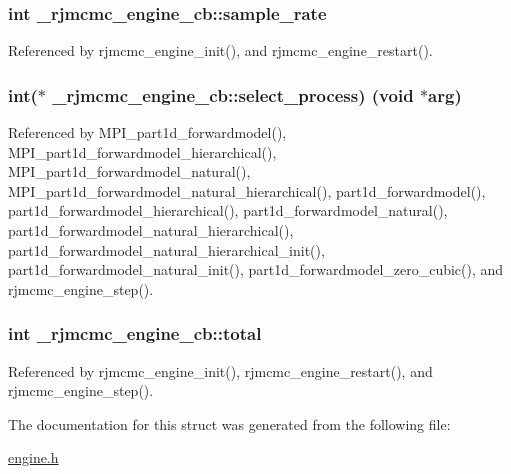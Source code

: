 \subsubsection[{\texorpdfstring{sample\+\_\+rate}{sample_rate}}]{\setlength{\rightskip}{0pt plus 5cm}int \+\_\+rjmcmc\+\_\+engine\+\_\+cb\+::sample\+\_\+rate}\hypertarget{struct__rjmcmc__engine__cb_a777c71c86acd53370442841472c24ef1}{}\label{struct__rjmcmc__engine__cb_a777c71c86acd53370442841472c24ef1}


Referenced by rjmcmc\+\_\+engine\+\_\+init(), and rjmcmc\+\_\+engine\+\_\+restart().

\subsubsection[{\texorpdfstring{select\+\_\+process}{select_process}}]{\setlength{\rightskip}{0pt plus 5cm}int($\ast$ \+\_\+rjmcmc\+\_\+engine\+\_\+cb\+::select\+\_\+process) (void $\ast${\bf arg})}\hypertarget{struct__rjmcmc__engine__cb_a7017792797b8ce47ed670044f1bc8a0d}{}\label{struct__rjmcmc__engine__cb_a7017792797b8ce47ed670044f1bc8a0d}


Referenced by M\+P\+I\+\_\+part1d\+\_\+forwardmodel(), M\+P\+I\+\_\+part1d\+\_\+forwardmodel\+\_\+hierarchical(), M\+P\+I\+\_\+part1d\+\_\+forwardmodel\+\_\+natural(), M\+P\+I\+\_\+part1d\+\_\+forwardmodel\+\_\+natural\+\_\+hierarchical(), part1d\+\_\+forwardmodel(), part1d\+\_\+forwardmodel\+\_\+hierarchical(), part1d\+\_\+forwardmodel\+\_\+natural(), part1d\+\_\+forwardmodel\+\_\+natural\+\_\+hierarchical(), part1d\+\_\+forwardmodel\+\_\+natural\+\_\+hierarchical\+\_\+init(), part1d\+\_\+forwardmodel\+\_\+natural\+\_\+init(), part1d\+\_\+forwardmodel\+\_\+zero\+\_\+cubic(), and rjmcmc\+\_\+engine\+\_\+step().

\subsubsection[{\texorpdfstring{total}{total}}]{\setlength{\rightskip}{0pt plus 5cm}int \+\_\+rjmcmc\+\_\+engine\+\_\+cb\+::total}\hypertarget{struct__rjmcmc__engine__cb_afda7df3424642cf0066ff9682784f9ea}{}\label{struct__rjmcmc__engine__cb_afda7df3424642cf0066ff9682784f9ea}


Referenced by rjmcmc\+\_\+engine\+\_\+init(), rjmcmc\+\_\+engine\+\_\+restart(), and rjmcmc\+\_\+engine\+\_\+step().



The documentation for this struct was generated from the following file\+:\begin{DoxyCompactItemize}
\item 
\hyperlink{engine_8h}{engine.\+h}\end{DoxyCompactItemize}
